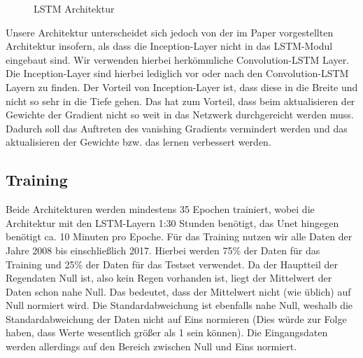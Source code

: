 \begin{figure}[h]
 \caption{LSTM Architektur}
\label{fig:LSTM-CNN}
\end{figure}

\noindent Unsere Architektur unterscheidet sich jedoch von der im Paper vorgestellten Architektur insofern, als dass die Inception-Layer nicht in das LSTM-Modul eingebaut sind.
Wir verwenden hierbei herkömmliche Convolution-LSTM Layer. Die Inception-Layer sind hierbei lediglich vor oder nach den Convolution-LSTM Layern zu finden.
Der Vorteil von Inception-Layer ist, dass diese in die Breite und nicht so sehr in die Tiefe gehen. Das hat zum Vorteil, dass beim aktualisieren der Gewichte der Gradient nicht so weit in das Netzwerk durchgereicht werden muss. Dadurch soll das Auftreten des vanishing Gradients vermindert werden und das aktualisieren der Gewichte bzw. das lernen verbessert werden.\\

\subsection{Training}
Beide Architekturen werden mindestens 35 Epochen trainiert, wobei die Architektur mit den LSTM-Layern 1:30 Stunden benötigt, das Unet hingegen benötigt ca. 10 Minuten pro Epoche.
Für das Training nutzen wir alle Daten der Jahre 2008 bis einschließlich 2017. Hierbei werden 75\% der Daten für das Training und 25\% der Daten für das Testset verwendet.
Da der Hauptteil der Regendaten Null ist, also kein Regen vorhanden ist, liegt der Mittelwert der Daten schon nahe Null. Das bedeutet, dass der Mittelwert nicht (wie üblich) auf Null normiert wird.
Die Standardabweichung ist ebenfalls nahe Null, weshalb die Standardabweichung der Daten nicht auf Eins normieren (Dies würde zur Folge haben, dass Werte wesentlich größer als 1 sein können). 
Die Eingangsdaten werden allerdings auf den Bereich zwischen Null und Eins normiert.\\

